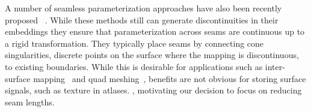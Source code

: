 A number of seamless parameterization approaches have also been recently proposed ~\cite{Kharevych,Myles}. While these methods still can generate discontinuities in their embeddings they ensure that parameterization across seams are continuous up to a rigid transformation. They typically place seams by connecting cone singularities, discrete points on the surface where the mapping is discontinuous, to existing boundaries. While this is desirable for applications such as inter-surface mapping~\cite{Aigerman} and quad meshing~\cite{Ray}, benefits are not obvious for storing surface signals, such as texture in atlases. , motivating our decision to focus on reducing seam lengths. %


